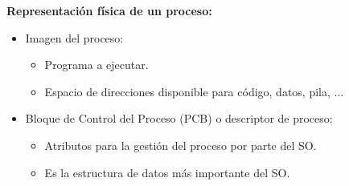 \documentclass{article}
\begin{document}
\textbf{Representación física de un proceso:}
\begin{itemize}
\item Imagen del proceso:
	\begin{itemize}
	\item Programa a ejecutar.
	
	\item Espacio de direcciones disponible para código, datos, pila, ...
	\end{itemize}

\item Bloque de Control del Proceso (PCB) o descriptor de proceso:
	\begin{itemize}
	\item Atributos para la gestión del proceso por parte del SO.
	
	\item Es la estructura de datos más importante del SO.
	\end{itemize}


\end{itemize}
\end{document}
